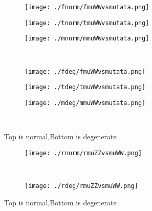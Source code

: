\documentclass[aps,floats,floatfix,nofootinbib]{revtex4-1}
\begin{document}
\begin{center}
\begin{figure}
\begin{subfigure}{0.3\textwidth}
\texttt{[image: ./fnorm/fmuWWvsmutata.png]}
\label{}
\end{subfigure}
\begin{subfigure}{0.3\textwidth}
\texttt{[image: ./tnorm/tmuWWvsmutata.png]}
\label{}
\end{subfigure}
\begin{subfigure}{0.3\textwidth}
\texttt{[image: ./mnorm/mmuWWvsmutata.png]}
\label{}
\end{subfigure}\\
\begin{subfigure}{0.3\textwidth}
\texttt{[image: ./fdeg/fmuWWvsmutata.png]}
\label{}
\end{subfigure}
\begin{subfigure}{0.3\textwidth}
\texttt{[image: ./tdeg/tmuWWvsmutata.png]}
\label{}
\end{subfigure}
\begin{subfigure}{0.3\textwidth}
\texttt{[image: ./mdeg/mmuWWvsmutata.png]}
\label{}
\end{subfigure}\\
\caption{Top is normal,Bottom is degenerate}
\end{figure}
\end{center}

\begin{center}
\begin{figure}
\begin{subfigure}{0.95\textwidth}
\texttt{[image: ./rnorm/rmuZZvsmuWW.png]}
\label{}
\end{subfigure}\\
\begin{subfigure}{0.95\textwidth}
\texttt{[image: ./rdeg/rmuZZvsmuWW.png]}
\label{}
\end{subfigure}
\caption{Top is normal,Bottom is degenerate}
\end{figure}
\end{center}
\end{document}
